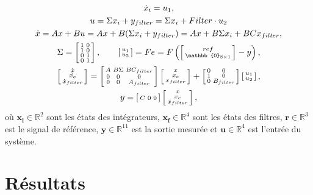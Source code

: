 \begin{equation}
\centering
    \begin{gathered}
        \dot{x}_i = u_1, \\
        u = \Sigma x_i + y_{filter} = \Sigma x_i + Filter \cdot u_2 \\
        \dot{x} = Ax + Bu = Ax + B(\Sigma x_i + y_{filter}) = Ax + B\Sigma x_i + B C x_{filter}, \\
        \Sigma =
        \smallmat{
            1 & 0 \\ 1 & 0 \\ 0 & 1 \\ 0 & 1   
        }, \quad \quad
        \smallmat{
            u_1 \\ u_2   
        }
        = F e = F \left(\smallmat{ref \\ \mathbb{0}_{8\times 1} }-y\right)  ,\\
        \smallmat{
            \dot{x} \\ \dot{x_c} \\ \dot{x}_{filter}
        } =
        \smallmat{
            A & B \Sigma & B C_{filter} \\
            0 & 0 & 0 \\
            0 & 0 & A_{filter} 
        }
        \smallmat{
            x \\ x_c \\ x_{filter}
        }
        +
        \smallmat{
            0 & 0 \\ 1 & 0 \\ 0 & B_{filter}
        }
        \smallmat{
            u_1 \\ u_2
        },  \\
        y = \smallmat{
            C & 0 & 0
        }
        \smallmat{
            x \\ x_c \\ x_{filter}
        },
    \end{gathered}
    \label{AugEq1}
\end{equation}
où $\boldsymbol{x_i} \in \mathbb{R}^{2}$ sont les états des intégrateurs,  $\boldsymbol{x_f} \in \mathbb{R}^{4}$ sont les états des filtres, $\boldsymbol{r} \in \mathbb{R}^{3}$ est le signal de référence, $\boldsymbol{y} \in \mathbb{R}^{11}$ est la sortie mesurée et $\boldsymbol{u}\in \mathbb{R}^{4}$ est l'entrée du système.

\section{Résultats}
\label{resultLMI}
